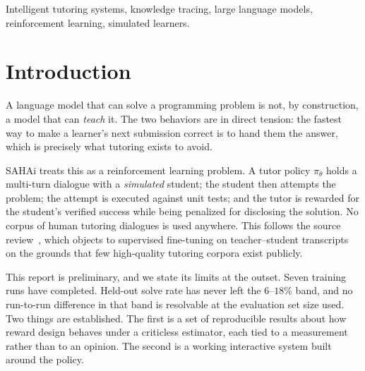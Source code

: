\documentclass[conference]{IEEEtran}
\begin{document}
\begin{IEEEkeywords}
Intelligent tutoring systems, knowledge tracing, large language models,
reinforcement learning, simulated learners.
\end{IEEEkeywords}

\section{Introduction}

A language model that can solve a programming problem is not, by
construction, a model that can \emph{teach} it. The two behaviors are in
direct tension: the fastest way to make a learner's next submission correct
is to hand them the answer, which is precisely what tutoring exists to
avoid.

SAHAi treats this as a reinforcement learning problem. A tutor policy
$\pi_\theta$ holds a multi-turn dialogue with a \emph{simulated} student;
the student then attempts the problem; the attempt is executed against unit
tests; and the tutor is rewarded for the student's verified success while
being penalized for disclosing the solution. No corpus of human tutoring
dialogues is used anywhere. This follows the source
review~\cite{rev-pedrl}, which objects to supervised fine-tuning on
teacher--student transcripts on the grounds that few high-quality tutoring
corpora exist publicly.

This report is preliminary, and we state its limits at the outset. Seven
training runs have completed. Held-out solve rate has never left the
$6$--$18\%$ band, and no run-to-run difference in that band is resolvable
at the evaluation set size used. Two things are established. The first is a set of reproducible results
about how reward design behaves under a criticless estimator, each tied to
a measurement rather than to an opinion. The second is a working
interactive system built around the policy.
\end{document}
